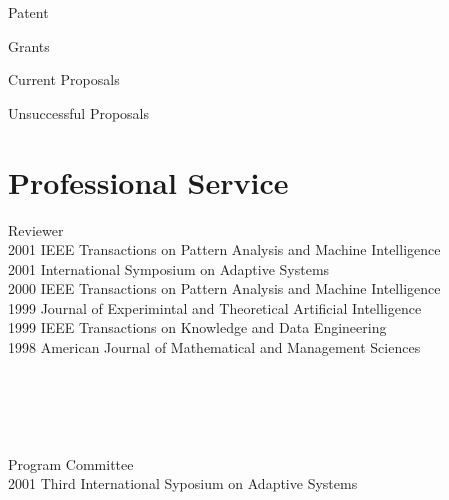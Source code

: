 \documentclass[11pt]{resume}
\begin{document}
\begin{citations}{Patent}{\bibfile}
\nocite{Reyes:Pyeatt95}
\end{citations}


\begin{citations}{Grants}{\bibfile}
\tenure \nocite{GrantA}
\nocite{GrantB}
\end{citations}

\begin{citations}{Current Proposals}{\bibfile}
\tenure \nocite{GrantProposalD}
\nocite{GrantProposalE}
\nocite{GrantProposalF}
\nocite{GrantProposalG}
\nocite{GrantProposalC}
\end{citations}

\begin{citations}{Unsuccessful Proposals}
{\bibfile}
\tenure 
\nocite{GrantProposalB}
\nocite{GrantProposalA}
\nocite{GrantProposalH}
\nocite{GrantProposalI}
\end{citations}




\section{Professional Service }{Reviewer}
        {\tenure\\
2001 IEEE Transactions on Pattern Analysis and Machine Intelligence\\
2001 International Symposium on Adaptive Systems\\
2000 IEEE Transactions on Pattern Analysis and Machine Intelligence \\ 
1999 Journal of Experimintal and Theoretical Artificial Intelligence\\
1999 IEEE Transactions on Knowledge and Data Engineering\\
\rm
1998 American Journal of Mathematical and Management Sciences\\
}

\section{\ }{Program Committee}
        {\tenure \\
2001 Third International Syposium on Adaptive Systems \\
}
\end{document}
